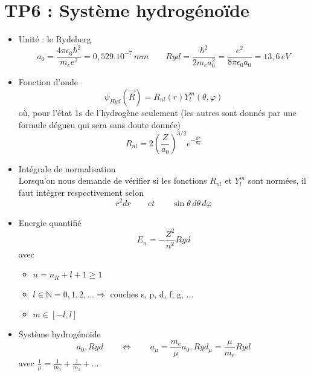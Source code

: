 
\section*{TP6 : Système hydrogénoïde}

\begin{itemize}
	\item Unité : le Rydeberg
		\begin{equation}
			a_0 = \frac{4\pi \epsilon _0 \hbar ^2}{m_e e^2} = 0,529 .10^{-7} \, mm \qquad Ryd = \frac{\hbar ^2}{2m_e a_0^2} = \frac{e^2}{8 \pi \epsilon_0 a_0} = 13,6 \, eV
		\end{equation}
		
	\item Fonction d'onde 
		\begin{equation}
			\psi _{Hyd} (\vec{R}) = R_{nl} (r) Y^m_l (\theta , \varphi )
		\end{equation}
		où, pour l'état 1s de l'hydrogène seulement (les autres sont donnés par une formule dégueu qui sera sans doute donnée)
		\begin{equation}
			R_{nl} = 2\left( \frac{Z}{a_0} \right) ^{3/2} e^{-\frac{Zr}{a_0}}
		\end{equation}
		
	\item Intégrale de normalisation \\
	Lorsqu'on nous demande de vérifier si les fonctions $R_{nl}$ et $Y^m_l$ sont normées, il faut intégrer respectivement selon 
	\begin{equation}
	r^2 dr \qquad et \qquad \sin \theta \, d\theta \, d\varphi
	\end{equation}
	\item Energie quantifié 
		\begin{equation}
			E_n = -\frac{Z^2}{n^2}Ryd
		\end{equation}
		avec 
			\begin{itemize}
				\item $n = n_R +l +1 \geq 1$
				\item $l \in \mathbb{N} = 0,1,2, \dots \Rightarrow$ couches s, p, d, f, g, $\dots$		
				\item $m \in [-l,l]$
			\end{itemize} 
	
	\item Système hydrogénoïde
		\begin{equation}
			a_0, Ryd \qquad \Leftrightarrow \qquad a_\mu = \frac{m_e}{\mu } a_0, Ryd_\mu = \frac{\mu }{m_e} Ryd
		\end{equation}
		avec $\frac{1}{\mu} = \frac{1}{m_1}+\frac{1}{m_2}+ \dots$
\end{itemize}